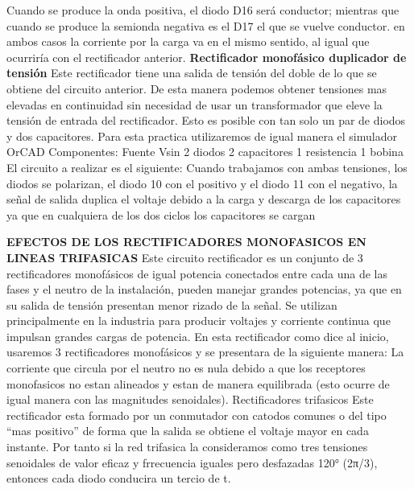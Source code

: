 Cuando se produce la onda positiva, el diodo D16 será conductor; mientras que cuando se produce la semionda negativa es el D17 el que se vuelve conductor. en ambos casos la corriente por la carga va en el mismo sentido, al igual que ocurriría con el rectificador anterior.
\textbf{ Rectificador monofásico duplicador de tensión} 
Este rectificador tiene una salida de tensión del doble de lo que se obtiene del circuito anterior. De esta manera podemos obtener tensiones mas elevadas en continuidad sin necesidad de usar un transformador que eleve la tensión de entrada del rectificador.
Esto es posible con tan solo un par de diodos y dos capacitores.
Para esta practica utilizaremos de igual manera el simulador OrCAD 
Componentes:
Fuente Vsin
2 diodos 
2 capacitores
1 resistencia
1 bobina 
El circuito a realizar es el siguiente:
Cuando trabajamos con ambas tensiones, los diodos se polarizan, el diodo 10 con el positivo y el diodo 11 con el negativo, la señal de salida duplica el voltaje debido a la carga y descarga de los capacitores ya que en cualquiera de los dos ciclos los capacitores se cargan

\textbf{EFECTOS DE LOS RECTIFICADORES MONOFASICOS EN LINEAS TRIFASICAS }
Este circuito rectificador es un conjunto de 3 rectificadores monofásicos de igual potencia conectados entre cada una de las fases y el neutro de la instalación, pueden manejar grandes potencias, ya que en su salida de tensión presentan menor rizado de la señal. Se utilizan principalmente en la industria para producir voltajes y corriente continua que impulsan grandes cargas de potencia.
En esta rectificador como dice al inicio, usaremos 3 rectificadores monofásicos y se presentara de la siguiente manera:
La corriente que circula por el neutro no es nula debido a que los receptores monofasicos no estan alineados y estan de manera equilibrada (esto ocurre de igual manera con las magnitudes senoidales).
Rectificadores trifasicos 
Este rectificador esta formado por un conmutador con catodos comunes o del tipo “mas positivo” de forma que la salida se obtiene el voltaje mayor en cada instante. Por tanto si la red trifasica la consideramos como tres tensiones senoidales de valor eficaz y frrecuencia iguales pero desfazadas 120° (2π/3), entonces cada diodo conducira un tercio de t.



